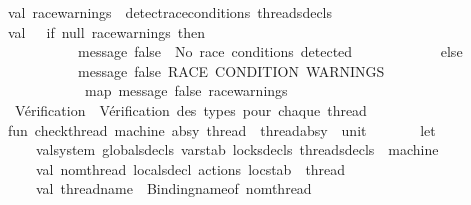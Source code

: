 \begin{isabellebody}
\ \ \ \ val\ race{\isacharunderscore}{\kern0pt}warnings\ {\isacharequal}{\kern0pt}\ detect{\isacharunderscore}{\kern0pt}race{\isacharunderscore}{\kern0pt}conditions\ threads{\isacharunderscore}{\kern0pt}decls\ \ \isanewline
\ \ \ \ val\ {\isacharunderscore}{\kern0pt}\ {\isacharequal}{\kern0pt}\ if\ null\ race{\isacharunderscore}{\kern0pt}warnings\ then\isanewline
\ \ \ \ \ \ \ \ \ \ \ \ \ \ message\ false\ {\isachardoublequote}{\kern0pt}{\isasymcheckmark}\ No\ race\ conditions\ detected{\isachardoublequote}{\kern0pt}\isanewline
\ \ \ \ \ \ \ \ \ \ \ \ else\isanewline
\ \ \ \ \ \ \ \ \ \ \ \ \ \ {\isacharparenleft}{\kern0pt}message\ false\ {\isachardoublequote}{\kern0pt}RACE\ CONDITION\ WARNINGS{\isacharcolon}{\kern0pt}{\isachardoublequote}{\kern0pt}{\isacharsemicolon}{\kern0pt}\isanewline
\ \ \ \ \ \ \ \ \ \ \ \ \ \ \ map\ {\isacharparenleft}{\kern0pt}message\ false{\isacharparenright}{\kern0pt}\ race{\isacharunderscore}{\kern0pt}warnings{\isacharsemicolon}{\kern0pt}\ {\isacharparenleft}{\kern0pt}{\isacharparenright}{\kern0pt}{\isacharparenright}{\kern0pt}\isanewline
\ \ \ \ \isanewline
\ \ \ \ {\isacharparenleft}{\kern0pt}{\isacharasterisk}{\kern0pt}\ Vérification\ {}{\isacharcolon}{\kern0pt}\ Vérification\ des\ types\ pour\ chaque\ thread\ {\isacharasterisk}{\kern0pt}{\isacharparenright}{\kern0pt}\isanewline
\ \ \ \ fun\ check{\isacharunderscore}{\kern0pt}thread\ {\isacharparenleft}{\kern0pt}machine\ {\isacharcolon}{\kern0pt}absy{\isacharparenright}{\kern0pt}\ {\isacharparenleft}{\kern0pt}thread\ {\isacharcolon}{\kern0pt}\ thread{\isacharunderscore}{\kern0pt}absy{\isacharparenright}{\kern0pt}\ {\isacharcolon}{\kern0pt}\ unit\ {\isacharequal}{\kern0pt}\isanewline
\ \ \ \ \ \ let\isanewline
\ \ \ \ \ \ \ \ val{\isacharbraceleft}{\kern0pt}system{\isacharcomma}{\kern0pt}\ globals{\isacharunderscore}{\kern0pt}decls{\isacharcomma}{\kern0pt}\ varstab{\isacharcomma}{\kern0pt}\ locks{\isacharunderscore}{\kern0pt}decls{\isacharcomma}{\kern0pt}\ threads{\isacharunderscore}{\kern0pt}decls{\isacharbraceright}{\kern0pt}\ {\isacharequal}{\kern0pt}\ machine\isanewline
\ \ \ \ \ \ \ \ val\ {\isacharbraceleft}{\kern0pt}nom{\isacharunderscore}{\kern0pt}thread{\isacharcomma}{\kern0pt}\ locals{\isacharunderscore}{\kern0pt}decl{\isacharcomma}{\kern0pt}\ actions{\isacharcomma}{\kern0pt}\ locstab{\isacharbraceright}{\kern0pt}\ {\isacharequal}{\kern0pt}\ thread\isanewline
\ \ \ \ \ \ \ \ val\ thread{\isacharunderscore}{\kern0pt}name\ {\isacharequal}{\kern0pt}\ Binding{\isachardot}{\kern0pt}name{\isacharunderscore}{\kern0pt}of\ nom{\isacharunderscore}{\kern0pt}thread\isanewline

\end{isabellebody}
